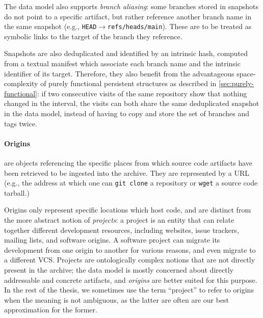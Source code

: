 The data model also supports \emph{branch aliasing}: some branches stored in
snapshots do not point to a specific artifact, but rather reference another
branch name in the same snapshot (e.g.,
\texttt{HEAD}$\to$\texttt{refs/heads/main}). These are to be treated as
symbolic links to the target of the branch they reference.

Snapshots are also deduplicated and identified by an intrinsic hash, computed
from a textual manifest which associate each branch name and the intrinsic
identifier of its target. Therefore, they also benefit from the advantageous
space-complexity of purely functional persistent structures as described in
\cref{sec:purely-functional}: if two consecutive visits of the same repository
show that nothing changed in the interval, the visits can both share the same
deduplicated snapshot in the data model, instead of having to copy and store
the set of branches and tags twice.


\begin{figure}\centering
{}
\end{figure}
\paragraph{\textbf{Origins}} are objects referencing the specific places from
which source code artifacts have been retrieved to be ingested into the
archive.  They are represented by a URL (e.g., the address at which
one can \texttt{git clone} a repository or \texttt{wget} a source code
tarball.)

Origins only represent specific locations which host code, and are distinct
from the more abstract notion of \emph{projects}: a project is an entity that
can relate together different development resources, including websites, issue
trackers, mailing lists, and software origins. A software project can migrate
its development from one origin to another for various reasons, and even
migrate to a different \gls{VCS}. Projects are ontologically complex notions
that are not directly present in the archive; the data model is mostly
concerned about directly addressable and concrete artifacts, and \emph{origins}
are better suited for this purpose. In the rest of the thesis, we sometimes use
the term ``project'' to refer to origins when the meaning is not ambiguous, as
the latter are often are our best approximation for the former.

